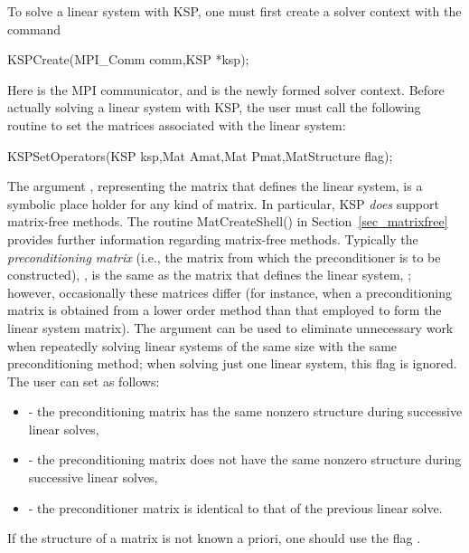To solve a linear system with KSP, one must first create a solver context 
with the command 
\begin{tabbing}
  KSPCreate(MPI\_Comm comm,KSP *ksp); 
\end{tabbing}
Here  is the MPI communicator, and  is the newly
formed solver context.
Before actually solving a linear system with KSP, the user must call 
the following routine to set the matrices associated with the linear
system: 
\begin{tabbing}
  KSPSetOperators(KSP ksp,Mat Amat,Mat Pmat,MatStructure flag);
\end{tabbing}
The argument , representing the matrix that defines the
linear system, is a symbolic place holder for any kind of matrix.  
In particular, KSP {\em does} support matrix-free methods. 
The routine MatCreateShell() 
in Section~\ref{sec_matrixfree} provides further information regarding
matrix-free methods. 
Typically the {\em preconditioning matrix} (i.e., the matrix from which the
preconditioner is to be constructed), , is the same as
the matrix that defines the linear system, ; however,
occasionally these matrices differ (for instance, 
when a preconditioning matrix is obtained from a lower order method than 
that employed to form the linear system matrix).
The argument  can be used to eliminate unnecessary work when
repeatedly solving linear systems of the same size with the same 
preconditioning method; when solving just one linear system, this flag is
ignored.  The user can set  as follows:
\begin{itemize}
\item {} - the preconditioning matrix has the
    same  nonzero structure during successive
    linear solves,
\item {} - the preconditioning matrix does
     not have the same nonzero structure during successive linear solves,
\item {} - the preconditioner matrix is identical
   to that of the previous linear solve. 
\end{itemize}
If the structure of a matrix is not known a priori, one should use
the flag .
 
